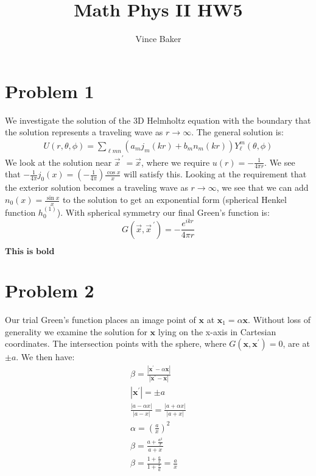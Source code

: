 \documentclass[a4paper,12pt]{article}
\title{Math Phys II HW5}
\author{Vince Baker}
\numberwithin{equation}{section}
\begin{document}
\maketitle

\section{Problem 1}
We investigate the solution of the 3D Helmholtz equation with the boundary that the solution represents a traveling wave as $r\rightarrow\infty$.
The general solution is:
\begin{gather}
 U(r,\theta,\phi)=\sum_{\ell mn}(a_mj_m(kr)+b_mn_m(kr) )Y_{\ell}^{m}(\theta, \phi)
\end{gather}
We look at the solution near $\vec{x}^{\ '}=\vec{x}$, where we require $u(r)=-\frac{1}{4\pi r}$.
We see that $-\frac{1}{4\pi}j_0(x)=(-\frac{1}{4\pi})\frac{\cos x}{x}$ will satisfy this. 
Looking at the requirement that the exterior solution becomes a traveling wave as $r\rightarrow\infty$, we see that we can add $n_0(x)=\frac{\sin x}{x}$ to the solution to get an exponential form 
(spherical Henkel function $h_0^{(1)}$).
With spherical symmetry our final Green's function is:
\begin{equation}
 G(\vec{x}, \vec{x}^{\ '})=-\frac{e^{ikr}}{4\pi r}
\end{equation}

$\textbf{This is bold}$

\section{Problem 2}
Our trial Green's function places an image point of $\textbf{x}$ at $\textbf{x}_1=\alpha \textbf{x}$.
Without loss of generality we examine the solution for $\textbf{x}$ lying on the x-axis in Cartesian coordinates.
The intersection points with the sphere, where $G(\textbf{x}, \textbf{x}^{'})=0$, are at $\pm a$.
We then have:
\begin{gather}
 \beta=\frac{|\textbf{x}^{'}-\alpha \textbf{x}|}{|\textbf{x}^{'}-\textbf{x} |}\\
 |\textbf{x}^{'}|=\pm a\\
 \frac{|a-\alpha x|}{|a-x|} = \frac{|a+\alpha x|}{|a+x|}\\
 \alpha = (\frac{a}{x})^2\\
 \beta = \frac{a+\frac{a^2}{x}}{a+x}\\
 \beta = \frac{1+\frac{a}{x}}{1+\frac{x}{a}}=\frac{a}{x}
\end{gather}
\end{document}
